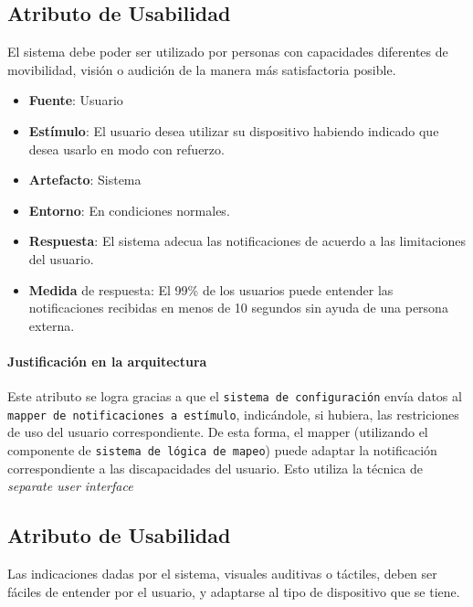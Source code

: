 \subsection{Atributo de Usabilidad}
El sistema debe poder ser utilizado por personas con capacidades diferentes de movibilidad, visión o audición de la manera más satisfactoria posible.

\begin{itemize}
  \item \textbf{Fuente}: Usuario
  \item \textbf{Estímulo}: El usuario desea utilizar su dispositivo habiendo indicado que desea usarlo en modo con refuerzo.
  \item \textbf{Artefacto}: Sistema
  \item \textbf{Entorno}: En condiciones normales.
  \item \textbf{Respuesta}: El sistema adecua las notificaciones de acuerdo a las limitaciones del usuario.
  \item \textbf{Medida} de respuesta: El 99\% de los usuarios puede entender las notificaciones recibidas en menos de 10 segundos sin ayuda de una persona externa.
\end{itemize}

\paragraph{Justificación en la arquitectura}
Este atributo se logra gracias a que el \texttt{sistema de configuración} envía datos al \texttt{mapper de notificaciones a estímulo}, indicándole, si hubiera, las restriciones de uso del usuario correspondiente. De esta forma, el mapper (utilizando el componente de \texttt{sistema de lógica de mapeo}) puede adaptar la notificación correspondiente a las discapacidades del usuario. Esto utiliza la técnica de \emph{separate user interface}

\subsection{Atributo de Usabilidad}
Las indicaciones dadas por el sistema, visuales auditivas o táctiles, deben ser fáciles de entender por el usuario, y adaptarse al tipo de dispositivo que se tiene.

